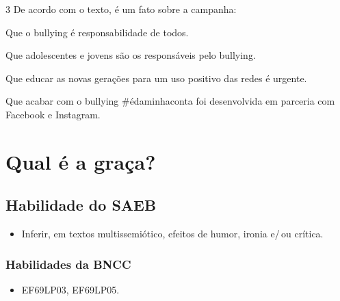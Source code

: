 \num{3} De acordo com o texto, é um fato sobre a campanha:

\begin{escolha}
\item Que o bullying é responsabilidade de todos.
\item Que adolescentes e jovens são os responsáveis pelo bullying.
\item Que educar as novas gerações para um uso positivo das redes é
urgente.
\item Que acabar com o bullying \#édaminhaconta foi desenvolvida em
parceria com Facebook e Instagram. 
\end{escolha}



\chapter{Qual é a graça?}

\section*{Habilidade do SAEB}
\begin{itemize}
\item Inferir, em textos multissemiótico, efeitos de humor, ironia e/\,ou crítica.
\end{itemize}

\subsection*{Habilidades da BNCC}
\begin{itemize}
\item EF69LP03, EF69LP05.
\end{itemize}

